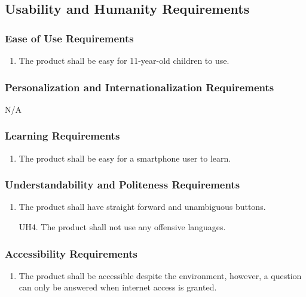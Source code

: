 \documentclass[]{article}
\begin{document}

\subsection{Usability and Humanity Requirements}
\label{sub:usability_and_humanity_requirements}

\subsubsection{Ease of Use Requirements}
\label{ssub:ease_of_use_requirements}
\begin{enumerate}[{UH}1. ]
	\item The product shall be easy for 11-year-old children to use.
\end{enumerate}

\subsubsection{Personalization and Internationalization Requirements}
\label{ssub:personalization_and_internationalization_requirements}
N/A

\subsubsection{Learning Requirements}
\label{ssub:learning_requirements}
\begin{enumerate}[{UH}2. ]
	\item The product shall be easy for a smartphone user to learn.
\end{enumerate}

\subsubsection{Understandability and Politeness Requirements}
\label{ssub:understandability_and_politeness_requirements}
\begin{enumerate}[{UH}3. ]
	\item The product shall have straight forward and unambiguous buttons.
	\item[{UH}4. ] The product shall not use any offensive languages.
\end{enumerate}

\subsubsection{Accessibility Requirements}
\label{ssub:accessibility_requirements}
\begin{enumerate}[{UH}5. ]
	\item The product shall be accessible despite the environment, however, a question can only be answered when internet access is granted.
\end{enumerate}
\end{document}
